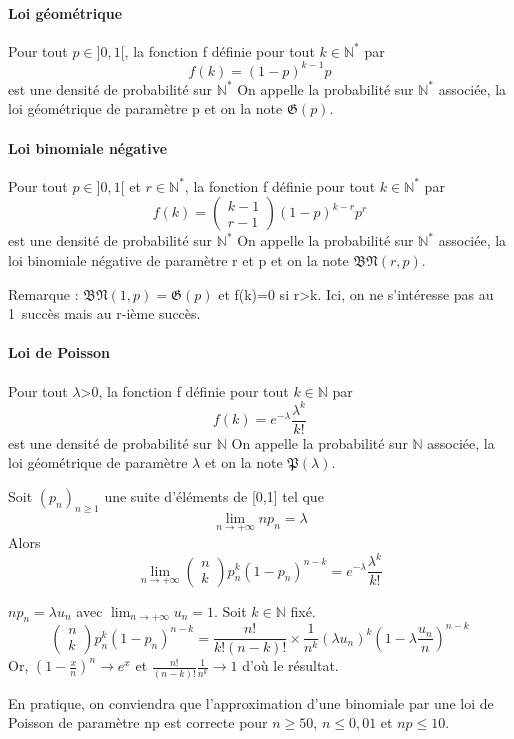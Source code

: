 \paragraph{Loi géométrique}
Pour tout $p\in]0,1[$, la fonction f définie pour tout $k\in\mathbb{N}^*$ par \[f(k)=(1-p)^{k-1}p\] est une densité de probabilité sur $\mathbb{N}^*$
On appelle la probabilité sur $\mathbb{N}^*$ associée, la loi géométrique de paramètre p et on la note $\mathfrak{G}(p)$. 

\paragraph{Loi binomiale négative}
Pour tout $p\in]0,1[$ et $r\in\mathbb{N}^*$, la fonction f définie pour tout $k\in\mathbb{N}^*$ par \[f(k)=\left(\begin{array}{r}k-1 \\ r-1 \end{array}\right)(1-p)^{k-r}p^r\] est une densité de probabilité sur $\mathbb{N}^*$
On appelle la probabilité sur $\mathbb{N}^*$ associée, la loi binomiale négative de paramètre r et p et on la note $\mathfrak{BN}(r,p)$. 

Remarque : $\mathfrak{BN}(1,p) = \mathfrak{G}(p)$ et f(k)=0 si r>k.
Ici, on ne s'intéresse pas au 1\ier\ succès mais au r-ième succès.

\paragraph{Loi de Poisson}
Pour tout $\lambda$>0, la fonction f définie pour tout $k\in\mathbb{N}$ par \[f(k)=e^{-\lambda}\frac{\lambda^k}{k!}\] est une densité de probabilité sur $\mathbb{N}$
On appelle la probabilité sur $\mathbb{N}$ associée, la loi géométrique de paramètre $\lambda$ et on la note $\mathfrak{P}(\lambda)$. 

\begin{theo}
Soit $(p_n)_{n \geqslant 1}$ une suite d'éléments de [0,1] tel que \[\lim_{n\rightarrow+\infty} np_n =\lambda\]
Alors \[\lim_{n\rightarrow+\infty} \left(\begin{array}{r}n \\ k \end{array}\right) p_n^k(1-p_n)^{n-k} = e^{-\lambda}\frac{\lambda^k}{k!}\]
\end{theo}

\begin{dem}
$np_n = \lambda u_n$ avec $\lim_{n\rightarrow+\infty} u_n = 1$.
Soit $k \in \mathbb{N}$ fixé.
\[\left(\begin{array}{r}n \\ k \end{array}\right) p_n^k(1-p_n)^{n-k} = \frac{n!}{k!(n-k)!} \times \frac{1}{n^k} (\lambda u_n)^k \left(1-\lambda \frac{u_n}{n}\right)^{n-k}\]
Or, $\left(1-\frac{x}{n}\right)^n \rightarrow e^{x}$ et $\frac{n!}{(n-k)!} \frac{1}{n^k} \rightarrow 1$ d'où le résultat.
\end{dem}

En pratique, on conviendra que l'approximation d'une binomiale par une loi de Poisson de paramètre np est correcte pour $n \geqslant 50$, $n \leqslant 0,01$ et $np \leqslant 10$. 

